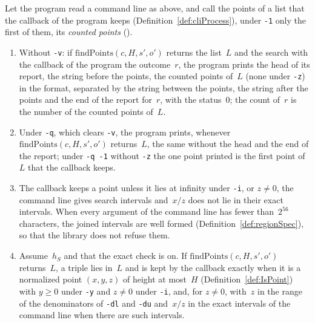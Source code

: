 \begin{theorem}\label{thm:cliRun}
  \leanok
  Let the program read a command line as above, and call the points of a list that the callback of
  the program keeps (Definition~\ref{def:cliProcess}), under \verb|-1| only the first of them, its
  \emph{counted points} ().
  \begin{enumerate}
    \item Without \verb|-v|: if $\mathrm{findPoints}(c, H, s', o')$ returns the list~$L$ and the
      search with the callback of the program the outcome~$r$, the program prints the head of its
      report, the string before the points, the counted points of~$L$ (none under \verb|-z|) in the
      format, separated by the string between the points, the string after the points and the end of
      the report for~$r$, with the status~$0$; the count of~$r$ is the number of the counted points
      of~$L$.
    \item Under \verb|-q|, which clears \verb|-v|, the program prints, whenever
      $\mathrm{findPoints}(c, H, s', o')$ returns~$L$, the same without the head and the end of the
      report; under \verb|-q -1| without \verb|-z| the one point printed is the first point of~$L$
      that the callback keeps.
    \item The callback keeps a point unless it lies at infinity under \verb|-i|, or $z \ne 0$, the
      command line gives search intervals and~$x/z$ does not lie in their exact intervals. When
      every argument of the command line has fewer than~$2^{56}$ characters, the joined intervals
      are well formed (Definition~\ref{def:regionSpec}), so that the library does not refuse them.
    \item Assume~$h_S$ and that the exact check is on. If $\mathrm{findPoints}(c, H, s', o')$
      returns~$L$, a triple lies in~$L$ and is kept by the callback exactly when it is a normalized
      point $(x, y, z)$ of height at most~$H$ (Definition~\ref{def:IsPoint}) with $y \ge 0$ under
      \verb|-y| and $z \ne 0$ under \verb|-i|, and, for $z \ne 0$, with~$z$ in the range of the
      denominators of \verb|-dl| and \verb|-du| and~$x/z$ in the exact intervals of the command line
      when there are such intervals.
  \end{enumerate}
\end{theorem}

